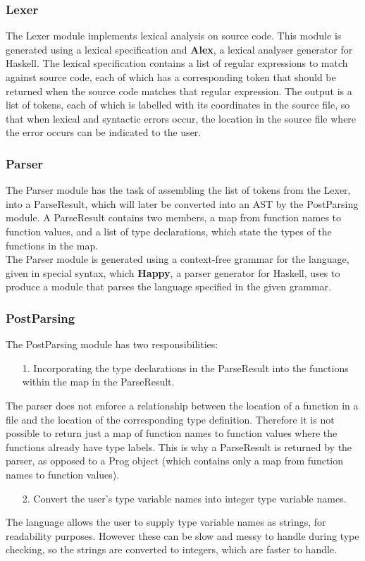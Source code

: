 \documentclass{article}
\begin{document}
\subsubsection{Lexer}
The Lexer module implements lexical analysis on source code. This module is generated using a lexical specification and \textbf{Alex}, a lexical analyser generator for Haskell. The lexical specification contains a list of regular expressions to match against source code, each of which has a corresponding token that should be returned when the source code matches that regular expression. The output is a list of tokens, each of which is labelled with its coordinates in the source file, so that when lexical and syntactic errors occur, the location in the source file where the error occurs can be indicated to the user.
\subsubsection{Parser}
The Parser module has the task of assembling the list of tokens from the Lexer, into a ParseResult, which will later be converted into an AST by the PostParsing module. A ParseResult contains two members, a map from function names to function values, and a list of type declarations, which state the types of the functions in the map.
\\\indent The Parser module is generated using a context-free grammar for the language, given in special syntax, which \textbf{Happy}, a parser generator for Haskell, uses to produce a module that parses the language specified in the given grammar.
\subsubsection{PostParsing}
The PostParsing module has two responsibilities:
\begin{enumerate}
    \item[1.] Incorporating the type declarations in the ParseResult into the functions within the map in the ParseResult.
\end{enumerate}
\indent The parser does not enforce a relationship between the location of a function in a file and the location of the corresponding type definition. Therefore it is not possible to return just a map of function names to function values where the functions already have type labels. This is why a ParseResult is returned by the parser, as opposed to a Prog object (which contains only a map from function names to function values).
\begin{enumerate}
    \item[2.] Convert the user's type variable names into integer type variable names.
\end{enumerate}
\indent The language allows the user to supply type variable names as strings, for readability purposes. However these can be slow and messy to handle during type checking, so the strings are converted to integers, which are faster to handle.
\end{document}
